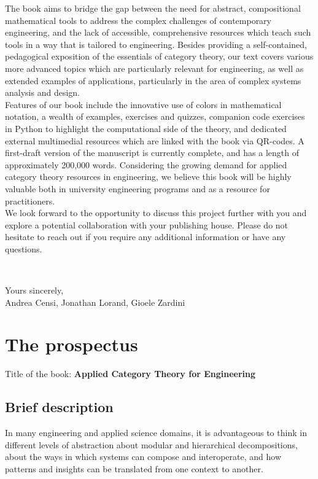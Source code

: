 \documentclass[10pt, article, one side]{memoir}
\begin{document}
    The book aims to bridge the gap between the need for abstract, compositional mathematical tools to address the complex challenges of contemporary engineering, and the lack of accessible, comprehensive resources which teach such tools in a way that is tailored to engineering.
    Besides providing a self-contained, pedagogical exposition of the essentials of category theory, our text covers various more advanced topics which are particularly relevant for engineering, as well as extended examples of applications, particularly in the area of complex systems analysis and design.
    \\[-7pt]

    Features of our book include the innovative use of colors in mathematical notation, a wealth of examples, exercises and quizzes, companion code exercises in Python to highlight the computational side of the theory, and dedicated external multimedial resources which are linked with the book via QR-codes.
    A first-draft version of the manuscript is currently complete, and has a length of approximately 200,000 words.
    Considering the growing demand for applied category theory resources in engineering, we believe this book will be highly valuable both in university engineering programs and as a resource for practitioners.
    \\[-7pt]

    We look forward to the opportunity to discuss this project further with you and explore a potential collaboration with your publishing house.
    Please do not hesitate to reach out if you require any additional information or have any questions.

    \

    \noindent Yours sincerely,\\

    \noindent \hspace{8cm}
    Andrea Censi, Jonathan Lorand, Gioele Zardini

    \newpage

    \chapter{The prospectus}
    Title of the book: \textbf{Applied Category Theory for Engineering}
    \section{Brief description}
    In many engineering and applied science domains, it is advantageous to think in different levels of abstraction about modular and hierarchical decompositions, about the ways in which systems can compose and interoperate, and how patterns and insights can be translated from one context to another.
\end{document}
